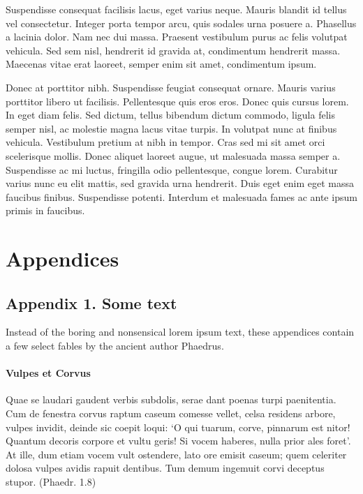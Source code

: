 \documentclass[english]{jamk-report}
\begin{document}
Suspendisse consequat facilisis lacus, eget varius neque. Mauris blandit id
tellus vel consectetur. Integer porta tempor arcu, quis sodales urna posuere a.
Phasellus a lacinia dolor. Nam nec dui massa. Praesent vestibulum purus ac
felis volutpat vehicula. Sed sem nisl, hendrerit id gravida at, condimentum
hendrerit massa.  Maecenas vitae erat laoreet, semper enim sit amet,
condimentum ipsum.~\parencite{Puuska_2019,Haar_1910,Sipola_2020}

Donec at porttitor nibh. Suspendisse feugiat consequat ornare.  Mauris varius
porttitor libero ut facilisis. Pellentesque quis eros eros. Donec quis cursus
lorem. In eget diam felis. Sed dictum, tellus bibendum dictum commodo, ligula
felis semper nisl, ac molestie magna lacus vitae turpis. In volutpat nunc at
finibus vehicula. Vestibulum pretium at nibh in tempor. Cras sed mi sit amet
orci scelerisque mollis. Donec aliquet laoreet augue, ut malesuada massa semper
a. Suspendisse ac mi luctus, fringilla odio pellentesque, congue lorem.
Curabitur varius nunc eu elit mattis, sed gravida urna hendrerit. Duis eget
enim eget massa faucibus finibus. Suspendisse potenti. Interdum et malesuada
fames ac ante ipsum primis in faucibus.




\clearpage

\printbibliography 

\clearpage

\appendix

\section*{Appendices}

\subsection*{Appendix 1. Some text}

Instead of the boring and nonsensical lorem ipsum text, these appendices 
contain a few select fables by the ancient author Phaedrus.

\paragraph{Vulpes et Corvus}
Quae se laudari gaudent verbis subdolis,
serae dant poenas turpi paenitentia.
Cum de fenestra corvus raptum caseum
comesse vellet, celsa residens arbore,
vulpes invidit, deinde sic coepit loqui:
`O qui tuarum, corve, pinnarum est nitor!
Quantum decoris corpore et vultu geris!
Si vocem haberes, nulla prior ales foret'.
At ille, dum etiam vocem vult ostendere,
lato ore emisit caseum; quem celeriter
dolosa vulpes avidis rapuit dentibus.
Tum demum ingemuit corvi deceptus stupor. 
(Phaedr. 1.8)
\end{document}
